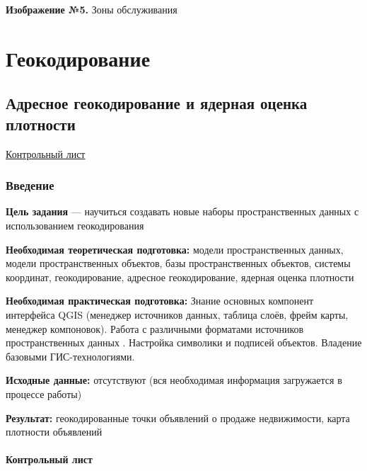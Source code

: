 \documentclass[
  12pt,
]{book}
\begin{document}
\textbf{Изображение №5.} Зоны обслуживания

\hypertarget{part-ux433ux435ux43eux43aux43eux434ux438ux440ux43eux432ux430ux43dux438ux435}{%
\part{Геокодирование}\label{part-ux433ux435ux43eux43aux43eux434ux438ux440ux43eux432ux430ux43dux438ux435}}

\hypertarget{geocoding}{%
\chapter{Адресное геокодирование и ядерная оценка плотности}\label{geocoding}}

\href{https://github.com/aentin/qgis-course/raw/master/files/Ex12_\%D0\%BE\%D1\%82\%D1\%87\%D1\%91\%D1\%82.docx}{Контрольный лист}

\hypertarget{geoding-intro}{%
\section{Введение}\label{geoding-intro}}

\textbf{Цель задания} --- научиться создавать новые наборы пространственных данных с использованием геокодирования

\textbf{Необходимая теоретическая подготовка:} модели пространственных данных, модели пространственных объектов, базы пространственных объектов, системы координат, геокодирование, адресное геокодирование, ядерная оценка плотности

\textbf{Необходимая практическая подготовка:} Знание основных компонент интерфейса QGIS (менеджер источников данных, таблица слоёв, фрейм карты, менеджер компоновок). Работа с различными форматами источников пространственных данных . Настройка символики и подписей объектов. Владение базовыми ГИС-технологиями.

\textbf{Исходные данные:} отсутствуют (вся необходимая информация загружается в процессе работы)

\textbf{Результат:} геокодированные точки объявлений о продаже недвижимости, карта плотности объявлений

\hypertarget{geocoding-control}{%
\subsection{Контрольный лист}\label{geocoding-control}}
\end{document}
